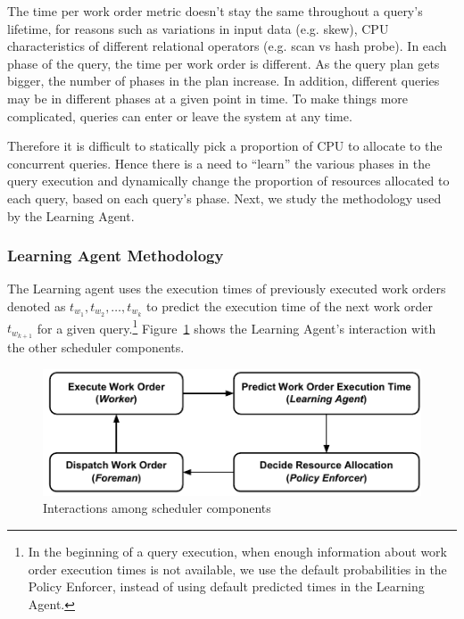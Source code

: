 The time per work order metric doesn't stay the same throughout a query's lifetime, for reasons such as variations in input data (e.g. skew), CPU characteristics of different relational operators (e.g. scan vs hash probe).
In each phase of the query, the time per work order is different.
As the query plan gets bigger, the number of phases in the plan increase.
In addition, different queries may be in different phases at a given point in time.
To make things more complicated, queries can enter or leave the system at any time.

Therefore it is difficult to statically pick a proportion of CPU to allocate to the concurrent queries. 
Hence there is a need to ``learn'' the various phases in the query execution and dynamically change the proportion of resources allocated to each query, based on each query's phase.
Next, we study the methodology used by the Learning Agent.
\subsubsection{Learning Agent Methodology}
The Learning agent uses the execution times of previously executed work orders 
denoted as $t_{w_{1}}, t_{w_{2}}, \ldots, t_{w_{k}}$ to predict the execution time of 
the next work order $t_{w_{k+1}}$ for a given query.\footnote{In the beginning of a query execution, when enough information about work order execution times is not available, we use the default probabilities in the Policy Enforcer, instead of using default predicted times in the Learning Agent.}
Figure~\ref{fig:scheduler-cycle} shows the Learning Agent's interaction with the other scheduler components.

\begin{figure}[]
	\centering
	\includegraphics[width=\linewidth]{figures/Compact-SchedulerCycle.pdf}
	\vspace{-2em}
	\caption{Interactions among scheduler components}
	\label{fig:scheduler-cycle}
\end{figure}

